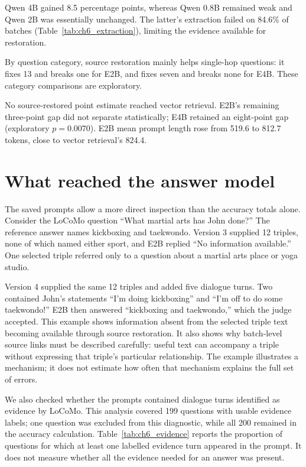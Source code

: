 Qwen 4B gained 8.5 percentage points, whereas Qwen 0.8B remained weak and Qwen 2B was
essentially unchanged. The latter's extraction failed on 84.6\% of batches
(Table~\ref{tab:ch6_extraction}), limiting the evidence available for restoration.

By question category, source restoration mainly helps single-hop questions: it fixes 13
and breaks one for E2B, and fixes seven and breaks none for E4B. These category comparisons
are exploratory.

No source-restored point estimate reached vector retrieval. E2B's remaining three-point
gap did not separate statistically; E4B retained an eight-point gap (exploratory
$p=0.0070$). E2B mean prompt length rose from 519.6 to 812.7 tokens, close to vector
retrieval's 824.4.

\section{What reached the answer model}
\label{sec:ch6_evidence}

The saved prompts allow a more direct inspection than the accuracy totals alone. Consider
the LoCoMo question ``What martial arts has John done?'' The reference answer names kickboxing
and taekwondo. Version 3 supplied 12 triples, none of which named either sport, and E2B replied
``No information available.'' One selected triple referred only to a question about a martial
arts place or yoga studio.

Version 4 supplied the same 12 triples and added five dialogue turns. Two contained John's
statements ``I'm doing kickboxing'' and ``I'm off to do some taekwondo!'' E2B then answered
``kickboxing and taekwondo,'' which the judge accepted. This example shows information absent
from the selected triple text becoming available through source restoration. It also shows why
batch-level source links must be described carefully: useful text can accompany a triple
without expressing that triple's particular relationship. The example illustrates a mechanism;
it does not estimate how often that mechanism explains the full set of errors.

We also checked whether the prompts contained dialogue turns identified as evidence by
LoCoMo. This analysis covered 199 questions with usable evidence labels; one question was
excluded from this diagnostic, while all 200 remained in the accuracy calculation.
Table~\ref{tab:ch6_evidence} reports the proportion of questions for which at least one
labelled evidence turn appeared in the prompt. It does not measure whether all the evidence
needed for an answer was present.

